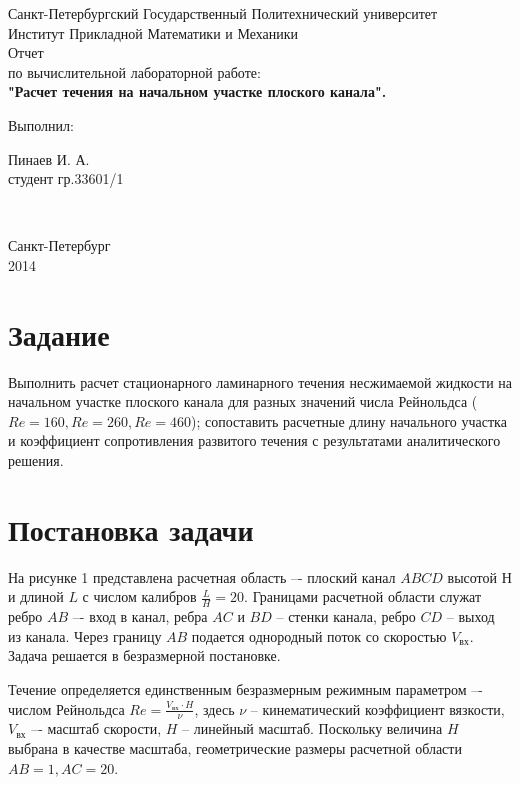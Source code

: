 \documentclass{article}
\newcommand{\n}{\vspace{\baselineskip}}
\newcommand{\pic}[3]
{
\noindent
\begin{minipage}{\linewidth}
  \center{\texttt{[image: \#2]}}
  \captionof{figure}{#3}
\end{minipage}
}
\begin{document}
\begin{center}{
\normalsize Санкт-Петербургский Государственный Политехнический университет\\
Институт Прикладной Математики и Механики\\
[7cm]
} 
\Huge Отчет\\ 
\large по вычислительной лабораторной работе:\\
\large	
\textbf{"Расчет течения на начальном участке плоского канала".} \\
[5cm]
\begin{flushleft}
\quad\quad Выполнил:  \hspace{10 cm} \parbox[t]{4.5cm}{Пинаев И. А. \\ студент гр.33601/1 }\\
\end{flushleft}
\vfill
{\large Санкт-Петербург \\ 2014} 
\end{center}
\thispagestyle{empty}
\newpage

\section{Задание}
Выполнить расчет стационарного ламинарного течения несжимаемой жидкости на начальном участке плоского канала для разных значений числа Рейнольдса ($Re = 160, Re = 260, Re = 460$); сопоставить расчетные длину начального участка и коэффициент сопротивления развитого течения с результатами аналитического решения. 

\section{Постановка задачи}

\n
\pic{0.5}{problem}{Плоский канал}

\noindent На рисунке 1 представлена расчетная область –- плоский канал $ABCD$ высотой $Н$ и длиной $L$ с числом калибров $\frac{L}{H} = 20$. Границами расчетной области служат ребро $AB$ –- вход в канал, ребра $AC$ и $BD$ -- стенки канала, ребро $CD$ -- выход из канала. Через границу $AB$ подается однородный поток со скоростью $V_{\text{вх}}$. Задача решается в безразмерной постановке.

\vspace{\baselineskip}

\noindent Течение определяется единственным безразмерным режимным параметром –- числом Рейнольдса $Re = \frac{V_{\text{вх}} \cdot H}{\nu}$, здесь $\nu$ – кинематический коэффициент вязкости, $V_{\text{вх}}$ –- масштаб скорости, $H$ – линейный масштаб. Поскольку величина $H$ выбрана в качестве масштаба, геометрические размеры расчетной области $AB = 1, AC = 20$. 
\end{document}
